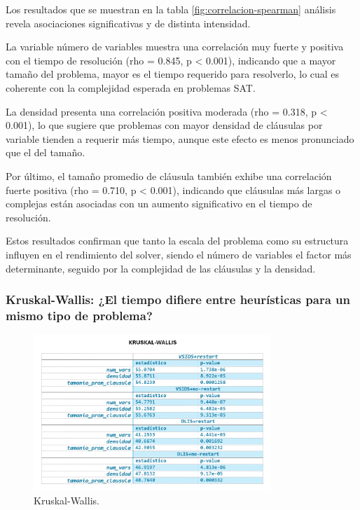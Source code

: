 Los resultados que se muestran en la tabla \ref{fig:correlacion-spearman} an\'alisis revela asociaciones significativas y de distinta intensidad.

La variable número de variables muestra una correlación muy fuerte y positiva con el tiempo de resolución (rho = 0.845, p < 0.001), indicando que a mayor tamaño del problema, mayor es el tiempo requerido para resolverlo, lo cual es coherente con la complejidad esperada en problemas SAT.

La densidad presenta una correlación positiva moderada (rho = 0.318, p < 0.001), lo que sugiere que problemas con mayor densidad de cláusulas por variable tienden a requerir más tiempo, aunque este efecto es menos pronunciado que el del tamaño.

Por último, el tamaño promedio de cl\'ausula tambi\'en exhibe una correlación fuerte positiva (rho = 0.710, p < 0.001), indicando que cláusulas más largas o complejas están asociadas con un aumento significativo en el tiempo de resolución.

Estos resultados confirman que tanto la escala del problema como su estructura influyen en el rendimiento del solver, siendo el número de variables el factor más determinante, seguido por la complejidad de las cláusulas y la densidad. 

\subsubsection{Kruskal-Wallis: ¿El tiempo difiere entre heurísticas para un mismo tipo de problema?}


\begin{figure}[ht]
    \centering
    \includegraphics[width=0.8\textwidth]{Graphics/kruskal_wallis.png}
    \caption{Kruskal-Wallis.}
    \label{fig:kruskal-wallis}
\end{figure}


